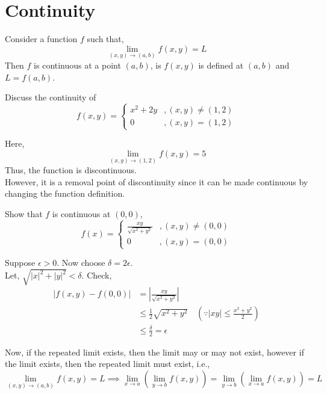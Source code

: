 \section{Continuity}
Consider a function $f$ such that,
\[\lim\limits_{(x,y)\to(a,b)}f(x,y)=L\]
Then $f$ is continuous at a point $(a,b)$, is $f(x,y)$ is defined at $(a,b)$ and $L=f(a,b)$.
\begin{eg}
	Discuss the continuity of
	\[f(x,y)=\begin{cases}
		x^2+2y &, (x,y)\neq(1,2)\\
		0 &, (x,y)=(1,2) 
	\end{cases}\]
\end{eg}
\begin{explanation}
	Here,
	\[\lim\limits_{(x,y)\to(1,2)}f(x,y)=5\]
	Thus, the function is discontinuous.\\
	However, it is a removal point of discontinuity since it can be made continuous by changing the function definition.
\end{explanation}
\begin{eg}
	Show that $f$ is continuous at $(0,0)$,
	\[f(x)=\begin{cases}
		\frac{xy}{\sqrt{x^2+y^2}} &, (x,y)\neq(0,0)\\
		0 &, (x,y)=(0,0)
	\end{cases}\]
\end{eg}
\begin{explanation}
	Suppose $\epsilon>0$. Now choose $\delta=2\epsilon$.\\
	Let, $\sqrt{|x|^2+|y|^2}<\delta$.
	Check,
	\[\begin{split}
		|f(x,y)-f(0,0)|&=|\frac{xy}{\sqrt{x^2+y^2}}|\\
		&\leq \frac{1}{2}\sqrt{x^2+y^2} \quad (\because |xy|\leq \frac{x^2+y^2}{2})\\
		&\leq \frac{\delta}{2}=\epsilon
	\end{split}\]
\end{explanation}
Now, if the repeated limit exists, then the limit may or may not exist, however if the limit exists, then the repeated limit must exist, i.e.,
\[\lim\limits_{(x,y)\to(a,b)}f(x,y)=L\implies \lim\limits_{x\to a}\left(\lim\limits_{y\to b}f(x,y)\right)=\lim\limits_{y\to b}\left(\lim\limits_{x\to a}f(x,y)\right)=L\]
